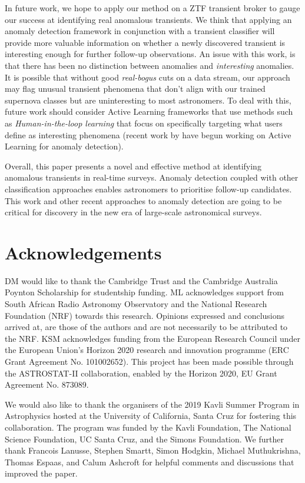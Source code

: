 \documentclass[fleqn,usenatbib]{mnras}
\begin{document}
In future work, we hope to apply our method on a ZTF transient broker to gauge our success at identifying real anomalous transients. We think that applying an anomaly detection framework in conjunction with a transient classifier will provide more valuable information on whether a newly discovered transient is interesting enough for further follow-up observations. An issue with this work, is that there has been no distinction between anomalies and \textit{interesting} anomalies. It is possible that without good \textit{real-bogus} cuts on a data stream, our approach may flag unusual transient phenomena that don't align with our trained supernova classes but are uninteresting to most astronomers. To deal with this, future work should consider Active Learning frameworks that use methods such as \textit{Human-in-the-loop learning} that focus on specifically targeting what users define as interesting phenomena (recent work by \citealt{Ishida2021_Timeseries,Lochner2020Astronomaly} have begun working on Active Learning for anomaly detection).

Overall, this paper presents a novel and effective method at identifying anomalous transients in real-time surveys. Anomaly detection coupled with other classification approaches enables astronomers to prioritise follow-up candidates. This work and other recent approaches to anomaly detection are going to be critical for discovery in the new era of large-scale astronomical surveys.

\section*{Acknowledgements}
DM would like to thank the Cambridge Trust and the Cambridge Australia Poynton Scholarship for studentship funding. ML acknowledges support from South African Radio Astronomy Observatory and the National Research Foundation (NRF) towards this research. Opinions expressed and conclusions arrived at, are those of the authors and are not necessarily to be attributed to the NRF.  KSM acknowledges funding from the European Research Council under the European Union's Horizon 2020 research and innovation programme (ERC Grant Agreement No. 101002652). This project has been made possible through the ASTROSTAT-II collaboration, enabled by the Horizon 2020, EU Grant Agreement No. 873089.

We would also like to thank the organisers of the 2019 Kavli Summer Program in Astrophysics hosted at the University of California, Santa Cruz for fostering this collaboration. The program was funded by the Kavli Foundation, The National Science Foundation, UC Santa Cruz, and the Simons Foundation. We further thank Francois Lanusse, Stephen Smartt, Simon Hodgkin, Michael Muthukrishna, Thomas Espaas, and Calum Ashcroft for helpful comments and discussions that improved the paper.
\end{document}
